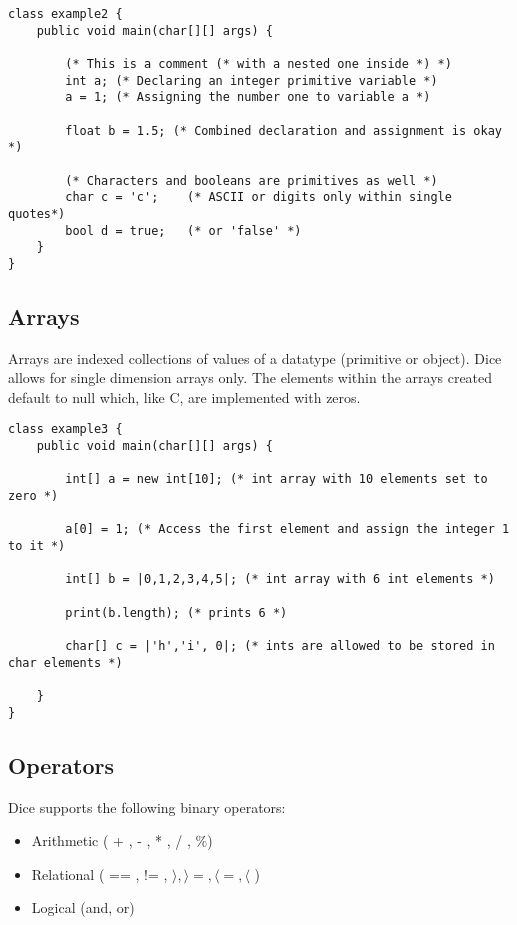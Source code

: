 \begin{homeworkProblem}
	\begin{verbatim}
class example2 {
	public void main(char[][] args) {

		(* This is a comment (* with a nested one inside *) *)
		int a; (* Declaring an integer primitive variable *)
		a = 1; (* Assigning the number one to variable a *)

		float b = 1.5; (* Combined declaration and assignment is okay *)

		(* Characters and booleans are primitives as well *)
		char c = 'c';    (* ASCII or digits only within single quotes*)
		bool d = true;   (* or 'false' *)
	}
}
	\end{verbatim}

	\subsection{Arrays}
	Arrays are indexed collections of values of a datatype (primitive or object). Dice allows for single dimension arrays only. The elements within the arrays created default to null which, like C, are implemented with zeros.

	\begin{verbatim}
class example3 {
	public void main(char[][] args) {

		int[] a = new int[10]; (* int array with 10 elements set to zero *)

		a[0] = 1; (* Access the first element and assign the integer 1 to it *)
		
		int[] b = |0,1,2,3,4,5|; (* int array with 6 int elements *)

		print(b.length); (* prints 6 *)

		char[] c = |'h','i', 0|; (* ints are allowed to be stored in char elements *) 

	}
}
	\end{verbatim}

	\subsection{Operators}
	Dice supports the following binary operators:
	\begin{itemize}
		\item Arithmetic ( + , - , * , / , $\%$)
		\item Relational ( == , != , $\rangle , \rangle= , \langle= , \langle$ )
		\item Logical (and, or)
	\end{itemize}


\end{homeworkProblem}
